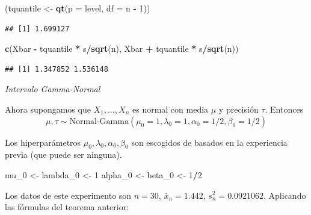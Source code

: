 \documentclass[
  12pt,
]{book}
\newenvironment{Shaded}{\begin{snugshade}}{\end{snugshade}}
\newcommand{\DataTypeTok}[1]{\textcolor[rgb]{0.13,0.29,0.53}{#1}}
\newcommand{\DecValTok}[1]{\textcolor[rgb]{0.00,0.00,0.81}{#1}}
\newcommand{\KeywordTok}[1]{\textcolor[rgb]{0.13,0.29,0.53}{\textbf{#1}}}
\newcommand{\NormalTok}[1]{#1}
\newcommand{\OperatorTok}[1]{\textcolor[rgb]{0.81,0.36,0.00}{\textbf{#1}}}
\newcommand{\StringTok}[1]{\textcolor[rgb]{0.31,0.60,0.02}{#1}}
\begin{document}
\begin{Shaded}
\begin{Highlighting}[]
\NormalTok{(tquantile \textless{}{-}}\StringTok{ }\KeywordTok{qt}\NormalTok{(}\DataTypeTok{p =}\NormalTok{ level, }\DataTypeTok{df =}\NormalTok{ n }\OperatorTok{{-}}\StringTok{ }\DecValTok{1}\NormalTok{))}
\end{Highlighting}
\end{Shaded}

\begin{verbatim}
## [1] 1.699127
\end{verbatim}

\begin{Shaded}
\begin{Highlighting}[]
\KeywordTok{c}\NormalTok{(Xbar }\OperatorTok{{-}}\StringTok{ }\NormalTok{tquantile }\OperatorTok{*}\StringTok{ }\NormalTok{s}\OperatorTok{/}\KeywordTok{sqrt}\NormalTok{(n), Xbar }\OperatorTok{+}\StringTok{ }\NormalTok{tquantile }\OperatorTok{*}\StringTok{ }
\StringTok{    }\NormalTok{s}\OperatorTok{/}\KeywordTok{sqrt}\NormalTok{(n))}
\end{Highlighting}
\end{Shaded}

\begin{verbatim}
## [1] 1.347852 1.536148
\end{verbatim}

\emph{Intervalo Gamma-Normal}

Ahora supongamos que \(X_1,\dots, X_n\) es normal con media
\(\mu\) y precisión
\(\tau\). Entonces
\[\mu,\tau \sim
\text{Normal-Gamma}(\mu_0 = 1, \lambda_0 = 1,\alpha_0 = 1/2, \beta_0 = 1/2)\]

Los hiperparámetros \(\mu_0,\lambda_0, \alpha_0, \beta_0\) son escogidos de
basados en la experiencia previa (que puede ser ninguna).

\begin{Shaded}
\begin{Highlighting}[]
\NormalTok{mu\_}\DecValTok{0}\NormalTok{ \textless{}{-}}\StringTok{ }\NormalTok{lambda\_}\DecValTok{0}\NormalTok{ \textless{}{-}}\StringTok{ }\DecValTok{1}
\NormalTok{alpha\_}\DecValTok{0}\NormalTok{ \textless{}{-}}\StringTok{ }\NormalTok{beta\_}\DecValTok{0}\NormalTok{ \textless{}{-}}\StringTok{ }\DecValTok{1}\OperatorTok{/}\DecValTok{2}
\end{Highlighting}
\end{Shaded}

Los datos de este experimento son \(n = 30\), \(\bar x_n = 1.442\), \(s_n^2 = 0.0921062\). Aplicando las fórmulas del teorema anterior:
\end{document}
